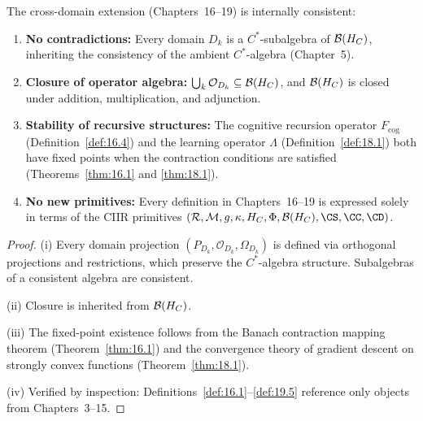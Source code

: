 \begin{theorem}\label{thm:19.4}
The cross-domain extension (Chapters~16--19) is internally consistent:
\begin{enumerate}
  \item[\textup{(i)}] \textbf{No contradictions:} Every domain
    $D_k$ is a $C^*$-subalgebra of $\mathcal{B}(H_C)$, inheriting the
    consistency of the ambient $C^*$-algebra (Chapter~5).
  \item[\textup{(ii)}] \textbf{Closure of operator algebra:}
    $\bigcup_k \mathcal{O}_{D_k} \subseteq \mathcal{B}(H_C)$, and
    $\mathcal{B}(H_C)$ is closed under addition, multiplication, and
    adjunction.
  \item[\textup{(iii)}] \textbf{Stability of recursive structures:}
    The cognitive recursion operator $F_{\mathrm{cog}}$
    (Definition~\ref{def:16.4}) and the learning operator $\Lambda$
    (Definition~\ref{def:18.1}) both have fixed points when the
    contraction conditions are satisfied
    (Theorems~\ref{thm:16.1} and \ref{thm:18.1}).
  \item[\textup{(iv)}] \textbf{No new primitives:} Every definition
    in Chapters~16--19 is expressed solely in terms of the CIIR
    primitives $(\CR, \CM, g, \kappa, \HC, \Phi, \CB(\HC), \CS,
    \CC, \CD)$.
\end{enumerate}
\end{theorem}

\begin{proof}
(i) Every domain projection $(P_{D_k}, \mathcal{O}_{D_k},
\Omega_{D_k})$ is defined via orthogonal projections and
restrictions, which preserve the $C^*$-algebra structure.  Subalgebras
of a consistent algebra are consistent.

(ii) Closure is inherited from $\mathcal{B}(H_C)$.

(iii) The fixed-point existence follows from the Banach contraction
mapping theorem (Theorem~\ref{thm:16.1}) and the convergence theory
of gradient descent on strongly convex functions
(Theorem~\ref{thm:18.1}).

(iv) Verified by inspection: Definitions~\ref{def:16.1}--\ref{def:19.5}
reference only objects from Chapters~3--15.
\end{proof}
